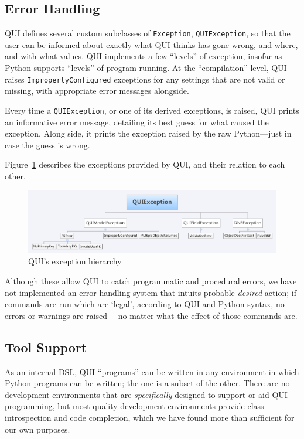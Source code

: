 \documentclass{article} %
\newcommand{\il}[1]{\mbox{\lstinline{#1}}}
\begin{document}
\subsection{Error Handling}
QUI defines several custom subclasses of \il{Exception}, \il{QUIException}, so that the
user can be informed about exactly what QUI thinks has gone wrong, and where, and with what values.
QUI implements a few ``levels'' of exception, insofar as Python supports ``levels'' of program running. At the ``compilation'' level, QUI
raises \il{ImproperlyConfigured} exceptions for any settings that are not valid or missing, with appropriate error messages alongside.

Every time a \il{QUIException}, or one of its derived exceptions, is raised, QUI prints an informative error message, detailing its best
guess for what caused the exception. Along side, it prints the exception raised by the raw Python---just in case the guess is wrong.

Figure~\ref{fig:exceptionhier} describes the exceptions provided by QUI, and their relation to each other.
\begin{figure}[htb]
\centering
\includegraphics[width=450px]{ExceptionHierarchy}
\caption{QUI's exception hierarchy}
\label{fig:exceptionhier}
\end{figure}

Although these allow QUI to catch programmatic and procedural errors, we have not implemented an error handling system that intuits
probable \emph{desired} action; if commands are run which are `legal', according to QUI and Python syntax, no errors or warnings are raised---
no matter what the effect of those commands are.

\subsection{Tool Support}
As an internal DSL, QUI ``programs'' can be written in any environment in which Python programs can be written; the one is a subset of the 
other. There are no development environments that are \emph{specifically} designed to support or aid QUI programming, but most quality
development environments provide class introspection and code completion, which we have found more than sufficient for our own
purposes. 
\end{document}
